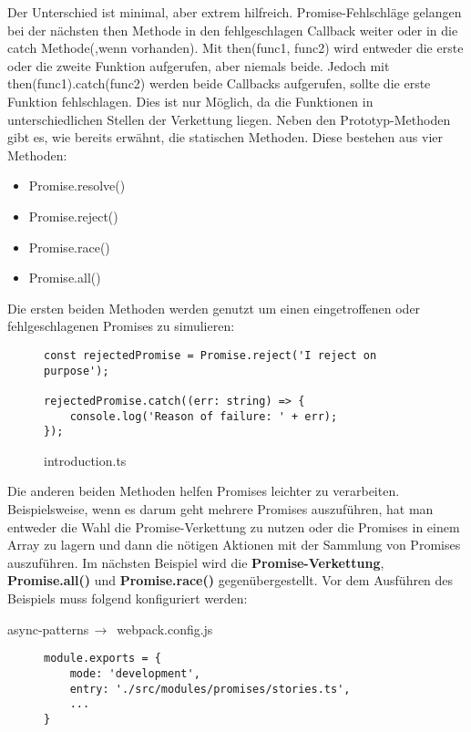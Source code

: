 \noindent
Der Unterschied ist minimal, aber extrem hilfreich. Promise-Fehlschläge gelangen bei der nächsten then Methode in den fehlgeschlagen Callback weiter oder in die catch Methode(,wenn vorhanden). Mit then(func1, func2) wird entweder die erste oder die zweite Funktion aufgerufen, aber niemals beide. Jedoch mit then(func1).catch(func2) werden beide Callbacks aufgerufen, sollte die erste Funktion fehlschlagen. Dies ist nur Möglich, da die Funktionen in unterschiedlichen Stellen der Verkettung liegen. Neben den Prototyp-Methoden gibt es, wie bereits erwähnt, die statischen Methoden. Diese bestehen aus vier Methoden:

\begin{itemize}
\item Promise.resolve()
\item Promise.reject()
\item Promise.race()
\item Promise.all()
\end{itemize}

\noindent
Die ersten beiden Methoden werden genutzt um einen eingetroffenen oder fehlgeschlagenen Promises zu simulieren:

\begin{figure}[H]
\begin{lstlisting}[basicstyle=\small]
const rejectedPromise = Promise.reject('I reject on purpose');

rejectedPromise.catch((err: string) => {
    console.log('Reason of failure: ' + err);
});
\end{lstlisting}
\caption{introduction.ts}
\end{figure}

\noindent
Die anderen beiden Methoden helfen Promises leichter zu verarbeiten. Beispielsweise, wenn es darum geht mehrere Promises auszuführen, hat man entweder die Wahl die Promise-Verkettung zu nutzen oder die Promises in einem Array zu lagern und dann die nötigen Aktionen mit der Sammlung von Promises auszuführen. Im nächsten Beispiel wird die \textbf{Promise-Verkettung}, \textbf{Promise.all()} und \textbf{Promise.race()} gegenübergestellt. Vor dem Ausführen des Beispiels muss folgend konfiguriert werden:

 \begin{center}
     async-patterns$\,\to\,$ webpack.config.js
 \end{center}

\begin{figure}[H]
\begin{lstlisting}[basicstyle=\small]
module.exports = {
    mode: 'development',
    entry: './src/modules/promises/stories.ts',
    ...
}
\end{lstlisting}
\end{figure}



